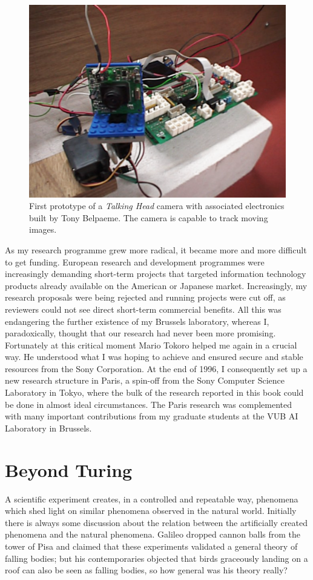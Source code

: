 \begin{figure}[htbp]
  \centerline{\includegraphics[width=.70\textwidth]{chap1/figs/eye.pdf}}
\caption{First prototype of a {\it Talking Head} camera with 
associated electronics built by Tony Belpaeme. The camera is capable to track moving images. }
\label{f:plate7}
\end{figure}

As my research programme grew more radical, it became more 
and more difficult to get funding. 
European research and development programmes were 
increasingly demanding short-term projects that targeted information
technology products already available on the American or Japanese 
market. Increasingly, my
research proposals were being rejected and running projects were
cut off,
as reviewers could not see direct short-term 
commercial benefits. All this was endangering the further existence
of my Brussels laboratory, whereas I, paradoxically, thought that
our research had never been more promising. 
Fortunately at this critical moment Mario Tokoro
helped me again in a crucial way. He understood what I was
hoping to achieve and ensured secure and stable resources from 
the Sony Corporation. At the end of 1996, I consequently set up a new research
structure in Paris, a spin-off from the Sony Computer Science
Laboratory in Tokyo, where the bulk of the research reported
in this book could be done in almost ideal circumstances. 
The Paris research was complemented with many important 
contributions from my graduate students
at the VUB AI Laboratory in Brussels. 

\section{Beyond Turing}

A scientific experiment creates, in a controlled
and repeatable way, phenomena which shed light on
similar phenomena observed in the natural
world. Initially there is
always some discussion about the relation between 
the artificially created phenomena and the natural
phenomena. Galileo dropped cannon balls from
the tower of Pisa and claimed that these experiments validated 
a general theory of falling bodies; but his contemporaries 
objected that birds graceously landing on a roof can
also be seen as falling bodies, so how general was 
his theory really?  

